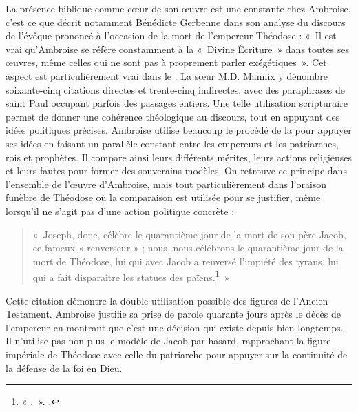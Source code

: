 La présence biblique comme cœur de son œuvre est une constante chez Ambroise, c'est ce que décrit notamment Bénédicte Gerbenne dans son analyse du discours de l'évêque prononcé à l'occasion de la mort de l'empereur Théodose : «~Il est vrai qu’Ambroise se réfère constamment à la «~Divine Écriture~» dans toutes ses œuvres, même celles qui ne sont pas à proprement parler exégétiques~»\autocite[161]{gerbenne_modeles}. Cet aspect est particulièrement vrai dans le . La sœur M.D. Mannix y dénombre soixante-cinq citations directes et trente-cinq indirectes, avec des paraphrases de saint Paul occupant parfois des passages entiers. Une telle utilisation scripturaire permet de donner une cohérence théologique au discours, tout en appuyant des idées politiques précises. Ambroise utilise beaucoup le procédé de la  pour appuyer ses idées en faisant un parallèle constant entre les empereurs et les patriarches, rois et prophètes. Il compare ainsi leurs différents mérites, leurs actions religieuses et leurs fautes pour former des souverains modèles. On retrouve ce principe dans l'ensemble de l'œuvre d'Ambroise, mais tout particulièrement dans l'oraison funèbre de Théodose où la comparaison est utilisée pour se justifier, même lorsqu'il ne s'agit pas d'une action politique concrète :

\bigskip

\begin{quote}
«~Joseph, donc, célèbre le quarantième jour de la mort de son père Jacob, ce fameux « renverseur » ; nous, nous célébrons le quarantième jour de la mort de Théodose, lui qui avec Jacob a renversé l'impiété des tyrans, lui qui a fait disparaître les statues des païens.\footnote{« .~». \cite[]{ambroise_mort_theodose}.}~»
\end{quote}

\bigskip

Cette citation démontre la double utilisation possible des figures de l'Ancien Testament. Ambroise justifie sa prise de parole quarante jours après le décès de l'empereur en montrant que c'est une décision qui existe depuis bien longtemps. Il n'utilise pas non plus le modèle de Jacob par hasard, rapprochant la figure impériale de Théodose avec celle du patriarche pour appuyer sur la continuité de la défense de la foi en Dieu.

